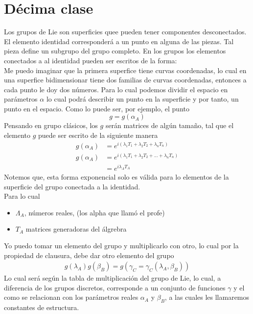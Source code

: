\documentclass[../main.tex]{subfiles}
\begin{document}
\section{Décima clase}
Los grupos de Lie son superficies quee pueden tener componentes desconectados. El elemento identidad corresponderá a un punto en alguna de las piezas. Tal pieza define un subgrupo del grupo completo. En los grupos los elementos conectados a al identidad pueden ser escritos de la forma: \\
Me puedo imaginar que la primera superfice tiene curvas coordenadas, lo cual en una superfice bidimensionar tiene dos familias de curvas coordenadas, entonces a cada punto le doy dos números. Para lo cual podemos dividir el espacio en parámetros $\alpha$ lo cual podrá describir un punto en la superficie y por tanto, un punto en el espacio. Como lo puede ser, por ejemplo, el punto
\begin{equation*}
  g = g(\alpha_A)
\end{equation*}
Pensando en grupo clásicos, los $g$ serán matrices de algún tamaño, tal que el elemento $g$ puede ser escrito de la siguiente manera
\begin{align*}
  g(\alpha_A)  & = e^{i(\lambda_1T_1+\lambda_2T_2 +\lambda_nT_n)} \\
  g(\alpha_A)  & = e^{i(\lambda_1T_1+\lambda_2T_2 + ... +\lambda_nT_n)} \\
  & = e^{i\lambda_AT_A}
\end{align*}
Notemos que, esta forma exponencial solo es válida para lo elementos de la superficie del grupo conectada a la identidad. \\
Para lo cual
\begin{itemize}
  \item $\Lambda_A$, números reales, (los alpha que llamó el profe)
  \item $T_A$ matrices generadoras del álgrebra 
\end{itemize}
Yo puedo tomar un elemento del grupo y multiplicarlo con otro, lo cual por la propiedad de clausura, debe dar otro elemento del grupo
\begin{align*}
  g(\lambda_A) g(\beta_B) = g(\gamma_C= \gamma_C(\lambda_A,\beta_B))
\end{align*}
Lo cual será según la tabla de multiplicación del grupo de Lie, lo cual, a diferencia de los grupos discretos, corresponde a un conjunto de funciones $\gamma$ y el como se relacionan con los parámetros reales $\alpha_A$ y $\beta_B$, a las cuales les llamaremos constantes de estructura. 
\end{document}
